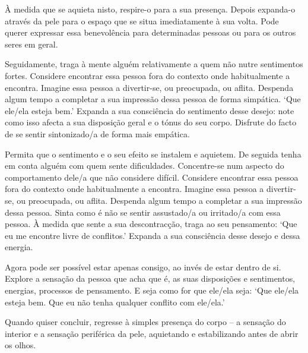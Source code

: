 À medida que se aquieta nisto, respire-o para a sua presença. Depois expanda-o através da pele para o espaço que se situa imediatamente à sua volta. Pode querer expressar essa benevolência para determinadas pessoas ou para os outros seres em geral.

Seguidamente, traga à mente alguém relativamente a quem não nutre sentimentos fortes. Considere encontrar essa pessoa fora do contexto onde habitualmente a encontra. Imagine essa pessoa a divertir-se, ou preocupada, ou aflita. Despenda algum tempo a completar a sua impressão dessa pessoa de forma simpática. `Que ele/ela esteja bem.' Expanda a sua consciência do sentimento desse desejo: note como isso afecta a sua disposição geral e o tónus do seu corpo. Disfrute do facto de se sentir sintonizado/a de forma mais empática.

Permita que o sentimento e o seu efeito se instalem e aquietem. De seguida tenha em conta alguém com quem sente dificuldades. Concentre-se num aspecto do comportamento dele/a que não considere difícil. Considere encontrar essa pessoa fora do contexto onde habitualmente a encontra. Imagine essa pessoa a divertir-se, ou preocupada, ou aflita. Despenda algum tempo a completar a sua impressão dessa pessoa. Sinta como é não se sentir assustado/a ou irritado/a com essa pessoa. À medida que sente a sua descontracção, traga ao seu pensamento: `Que eu me encontre livre de conflitos.' Expanda a sua consciência desse desejo e dessa energia.

Agora pode ser possível estar apenas consigo, ao invés de estar dentro de si. Explore a sensação da pessoa que acha que é, as suas disposições e sentimentos, energias, processos de pensamento. E seja como for que ele/ela seja: `Que ele/ela esteja bem. Que eu não tenha qualquer conflito com ele/ela.'

Quando quiser concluir, regresse à simples presença do corpo -- a sensação do interior e a sensação periférica da pele, aquietando e estabilizando antes de abrir os olhos.
